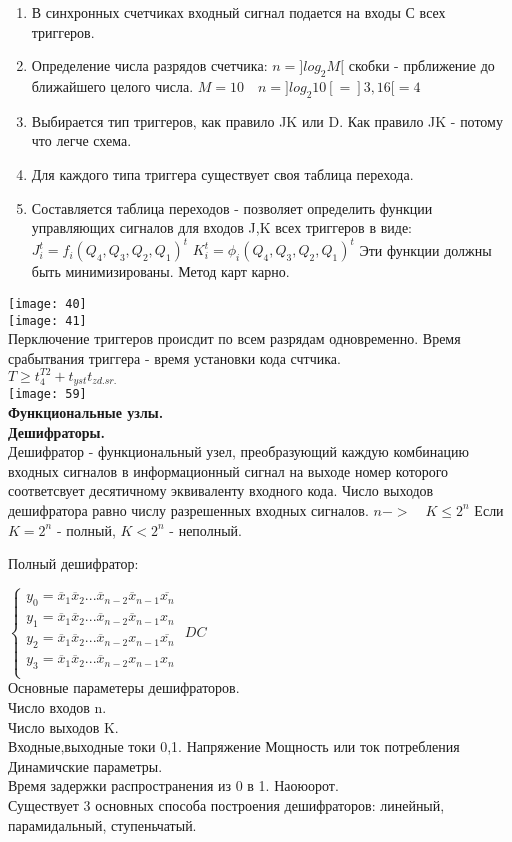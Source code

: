 \begin{enumerate}
  \item В синхронных счетчиках входный сигнал подается на входы С всех триггеров.
  \item Определение числа разрядов счетчика: $n = ]log_2 M[$ скобки - прближение до ближайшего целого числа.
  $M =10 \quad n = ]log_2 10 [ = ]3,16[ = 4 $
  \item Выбирается тип триггеров, как правило JK или D.
  Как правило JK - потому что легче схема.
  \item Для каждого типа триггера существует своя таблица перехода.
  \item Составляется таблица переходов - позволяет определить функции управляющих сигналов для входов J,K всех триггеров в виде:
  $ J_i^t = f_i(Q_4,Q_3,Q_2,Q_1)^t$  $ K_i^t = \phi_i(Q_4,Q_3,Q_2,Q_1)^t$
  Эти функции должны быть минимизированы. Метод карт карно.
\end{enumerate}
\texttt{[image: 40]}\\
\texttt{[image: 41]}\\
Перключение триггеров происдит по всем разрядам одновременно.
Время срабытвания триггера - время установки кода счтчика.\\
$T \geq t_4^{T2} + t_{yst} t_{zd.sr.}$\\
\texttt{[image: 59]}\\


\Large{ \textbf {Функциональные узлы.}}\\
\textbf{Дешифраторы.}\\
Дешифратор - функциональный узел, преобразующий каждую комбинацию входных сигналов в информационный
сигнал на выходе номер которого соответсвует десятичному эквиваленту входного кода.
Число выходов дешифратора равно числу разрешенных входных сигналов. $ n -> \quad K \leq 2^n$ Если  $K = 2^n$ - полный,  $K < 2^n$ - неполный.

Полный дешифратор:

$\begin{cases}
  y_0 = \overline{x}_1 \overline{x}_2 ... \overline{x}_{n-2} \overline{x}_{n-1} \overline{x_n} \\
  y_1 = \overline{x}_1 \overline{x}_2 ... \overline{x}_{n-2} \overline{x}_{n-1} {x_n}\\
  y_2=  \overline{x}_1 \overline{x}_2 ... \overline{x}_{n-2} x_{n-1} \overline{x_n}\\
  y_3=  \overline{x}_1 \overline{x}_2 ... \overline{x}_{n-2} x_{n-1} {x_n} \\

\end{cases}$
$DC $\\
Основные параметеры дешифраторов.\\
Число входов n.\\
Число выходов K.\\
Входные,выходные токи 0,1.
Напряжение
Мощность или ток потребления \\

Динамичские параметры.\\
Время задержки распространения из 0 в 1. Наоюорот.\\

Существует 3 основных способа построения дешифраторов: линейный, парамидальный, ступеньчатый.
